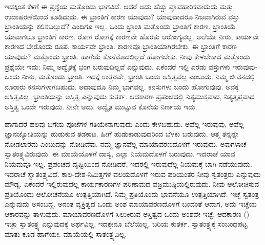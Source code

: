 ಇದಕ್ಕಿಂತ ಕೆಳಗೆ ಈ ಪ್ರಶ್ನೆಯ ಮತ್ತೊಂದು ಭಾಗವಿದೆ. ಆದರೆ ಅದು ಹೆಚ್ಚು ವ್ಯಾವಹಾರಿಕವಾದುದು ಮತ್ತು ಉದಾಹರಣೆಯಿಂದ ಕೂಡಿದುದು. ಈ ಭ್ರಾಂತಿಗೆ ಕಾರಣ ಯಾವುದು? ಯಾವುದಾದರೂ ನಿಜವಾಗಿರುವ ವಸ್ತು ಭ್ರಾಂತಿಯನ್ನು ಕಲಿಸಬಲ್ಲುದೆ? ಎಂದಿಗೂ ಇಲ್ಲ. ಒಂದು ಭ್ರಾಂತಿ ಮತ್ತೊಂದು ಭ್ರಾಂತಿಗೆ ಕಾರಣ. ಭ್ರಾಂತಿಯೆ ಯಾವಾಗಲೂ ಭ್ರಾಂತಿಗೆ ಕಾರಣ. ರೋಗ ರೋಗಕ್ಕೆ ಕಾರಣವೇ ಹೊರತು ಆರೋಗ್ಯವಲ್ಲ. ಅಲೆಯೇ ನೀರು, ಕಾರ್ಯವೇ ಕಾರಣದ ಬೇರೊಂದು ರೂಪ. ಕಾರ್ಯವೇ ಭ್ರಾಂತಿ. ಕಾರಣವೂ ಭ್ರಾಂತಿಯಾಗಿರಬೇಕು. ಈ ಭ್ರಾಂತಿಗೆ ಕಾರಣ ಯಾವುದು? ಮತ್ತೊಂದು ಭ್ರಾಂತಿ. ಹಾಗೆಯೆ ಕೊನೆಮೊದಲಿಲ್ಲದೆ ಹೋಗಬೇಕು. ನೀವು ಕೇಳಬೇಕಾದ ಮತ್ತೊಂದು ಪ್ರಶ್ನೆಯೇ ಇದು: ನಿಮ್ಮ ಅದ್ವೈತಕ್ಕೆ ಭಂಗ ಬರುವುದಿಲ್ಲವೆ ಎನ್ನುವುದು. ಏಕೆಂದರೆ ಇಲ್ಲಿ ಎರಡು ವಸ್ತುಗಳು ಇರುವುವು-ಒಂದು ನೀನು, ಮತ್ತೊಂದು ಭ್ರಾಂತಿ. ಇದಕ್ಕೆ ಉತ್ತರವೇ, ಭ್ರಾಂತಿ ಒಂದು ಅಸ್ತಿತ್ವವಲ್ಲ ಎಂಬುದು. ನಿಮ್ಮ ಜೀವನದಲ್ಲಿ ನೂರಾರು ಕನಸುಗಳಾಗಬಹುದು. ಅದಾವುದೂ ನಿಮ್ಮ ಭಾಗವಲ್ಲ. ಕನಸುಗಳು ಬಂದು ಹೋಗುವುವು. ಅವಕ್ಕೆ ಅಸ್ತಿತ್ವವಿಲ್ಲ. ಭ್ರಾಂತಿಯನ್ನು ಅಸ್ತಿತ್ವ ಎನ್ನುವುದು ಕುತರ್ಕ. ಆದಕಾರಣ ಪ್ರಪಂಚದಲ್ಲಿ ನಿತ್ಯಮುಕ್ತವಾದ, ನಿತ್ಯತೃಪ್ತವಾದ ಅಸ್ತಿತ್ವ ಒಂದೇ ಇರುವುದು. ನೀನೇ ಅದು. ಅದ್ವೈತ ಮುಟ್ಟುವ ಕೊನೆಯ ನಿರ್ಣಯ ಇದು.

ಹಾಗಾದರೆ ಹಲವು ಬಗೆಯ ಪೂಜೆಗಳ ಗತಿಯೇನಾಗುವುದು ಎಂದು ಕೇಳಬಹುದು. ಅವೆಲ್ಲ ಇರುವುವು, ಅವೆಲ್ಲ ಜ್ಞಾನಜ್ಯೋತಿಯನ್ನು ಹುಡುಕುವ ತಡಕಾಟ. ಹೀಗೆ ಹುಡುಕಾಡುವುದರಿಂದ ಬೆಳಕು ಬರುವುದು. ಆತ್ಮ ತನ್ನನ್ನೇ ನೋಡಲಾರದು ಎಂಬುದನ್ನು ನೋಡಿದೆವು. ನಮ್ಮ ಜ್ಞಾನವೆಲ್ಲ ಮಾಯಾವರಣದೊಳಗೆ ಇರುವುದು. ಅವುಗಳಾಚೆ ಸ್ವಾತಂತ್ರ್ಯವಿರುವುದು. ಈ ಮಾಯೆಯೊಳಗೆ ದಾಸ್ಯ, ಎಲ್ಲಾ ನಿಯಮದೊಳಗೆ ಬರುವುದು. ಇದರಾಚೆ ಯಾವ ನಿಯಮವೂ ಇಲ್ಲ. ಪ್ರಪಂಚದ ದೃಷ್ಟಿಯಿಂದ ನೋಡಿದರೆ, ಇದರಲ್ಲಿ ಇರುವುದೆಲ್ಲ ನಿಯಮಕ್ಕೆ ಬಾಗಿ ನಡೆಯುವುದು. ಇದರಾಚೆ ಸ್ವಾತಂತ್ರ್ಯವಿದೆ. ಕಾಲ-ದೇಶ-ನಿಮಿತ್ತಗಳ ವಲಯದೊಳಗೆ ಇರುವ ಪರಿಯಂತರ ನೀವು ಸ್ವತಂತ್ರರು ಎನ್ನುವುದು ಮೌಡ್ಯ. ಏಕೆಂದರೆ ಇಲ್ಲಿರುವುದೆಲ್ಲ ಕಾರ್ಯಕಾರಣಗಳ ಪರಿಣಾಮದ ವಜ್ರಮುಷ್ಠಿಯಲ್ಲಿರುವುದು. ನೀವು ಆಲೋಚಿಸುವ ಪ್ರತಿಯೊಂದು ಆಲೋಚನೆಯೂ ಉತ್ಪತ್ತಿಯಾಗಿದೆ. ನಿಮ್ಮ ಪ್ರತಿಯೊಂದು ಭಾವನೆಯೂ ಉತ್ಪತ್ತಿಯಾಗಿದೆ. ಇಚ್ಛೆ ಸ್ವತಂತ್ರ ಎನ್ನುವುದು ಅಸಂಬದ್ಧ. ಅನಂತ ವ್ಯಕ್ತಿತ್ವದ ಒಂದು ಅಂಶ ಮಾಯಾವರಣದೊಳಗೆ ಬಂದಂತೆ ಆದಾಗ, ಅದು ಇಚ್ಚೆಯ ಆಕಾರವನ್ನು ತಾಳುವುದು. ಮಾಯಾವರಣದೊಳಗೆ ಸಿಲುಕಿರುವ ಅಸ್ತಿತ್ವದ ಒಂದು ಅಂಶವೇ ಇಚ್ಛೆ. ಆದಕಾರಣ () ಇಚ್ಛಾ ಸ್ವಾತಂತ್ರ್ಯ ಎನ್ನುವುದಕ್ಕೆ ಅರ್ಥವಿಲ್ಲ, ಇದಕ್ಕೇನೂ ಬೆಲೆಯಿಲ್ಲ, ಬರಿಯ ಕುತರ್ಕ. ಸ್ವಾತಂತ್ರ್ಯಕ್ಕೆ ಸಂಬಂಧಪಟ್ಟ ಮಾತು ಕೂಡ ಹಾಗೆಯೇ. ಮಾಯೆಯಲ್ಲಿ ಸಾತಂತ್ರ್ಯವಿಲ್ಲ.

